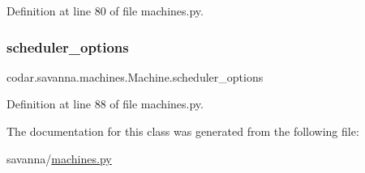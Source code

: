 Definition at line 80 of file machines.\+py.

\mbox{\label{classcodar_1_1savanna_1_1machines_1_1_machine_aa26c50a13e89160894eff5a7fb180ed7}} 
\subsubsection{\texorpdfstring{scheduler\+\_\+options}{scheduler\_options}}
{\footnotesize\ttfamily codar.\+savanna.\+machines.\+Machine.\+scheduler\+\_\+options}



Definition at line 88 of file machines.\+py.



The documentation for this class was generated from the following file\+:\begin{DoxyCompactItemize}
\item 
savanna/\hyperlink{machines_8py}{machines.\+py}\end{DoxyCompactItemize}
